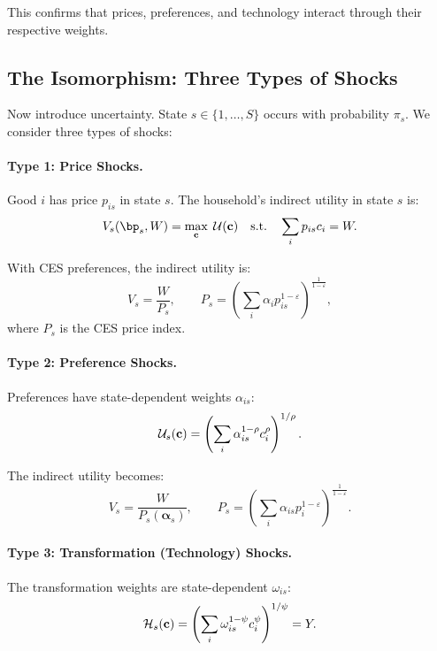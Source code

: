 This confirms that prices, preferences, and technology interact through their respective weights.

\subsection{The Isomorphism: Three Types of Shocks}
\label{subsec:ac-iso-three-shocks}

Now introduce uncertainty. State $s \in \{1, \ldots, S\}$ occurs with probability $\pi_s$. We consider three types of shocks:

\paragraph{Type 1: Price Shocks.}
Good $i$ has price $p_{is}$ in state $s$. The household's indirect utility in state $s$ is:
\begin{equation}
V_s(\bp_s, W) = \max_{\bc} \; \mathcal{U}(\bc) \quad \text{s.t.} \quad \sum_i p_{is} c_i = W.
\label{eq:ac-iso-indirect}
\end{equation}

With CES preferences, the indirect utility is:
\begin{equation}
V_s = \frac{W}{P_s}, \qquad P_s = \left( \sum_i \alpha_i p_{is}^{1-\varepsilon} \right)^{\frac{1}{1-\varepsilon}},
\label{eq:ac-iso-indirect-ces}
\end{equation}
where $P_s$ is the CES price index.

\paragraph{Type 2: Preference Shocks.}
Preferences have state-dependent weights $\alpha_{is}$:
\begin{equation}
\mathcal{U}_s(\mathbf{c}) = \left( \sum_i \alpha_{is}^{1-\rho} c_i^{\rho} \right)^{1/\rho}.
\label{eq:ac-iso-pref-shock}
\end{equation}

The indirect utility becomes:
\begin{equation}
V_s = \frac{W}{P_s(\boldsymbol{\alpha}_s)}, \qquad P_s = \left( \sum_i \alpha_{is} p_i^{1-\varepsilon} \right)^{\frac{1}{1-\varepsilon}}.
\label{eq:ac-iso-indirect-pref}
\end{equation}

\paragraph{Type 3: Transformation (Technology) Shocks.}
The transformation weights are state-dependent $\omega_{is}$:
\begin{equation}
\mathcal{H}_s(\mathbf{c}) = \left( \sum_i \omega_{is}^{1-\psi} c_i^{\psi} \right)^{1/\psi} = Y.
\label{eq:ac-iso-tech-shock}
\end{equation}

